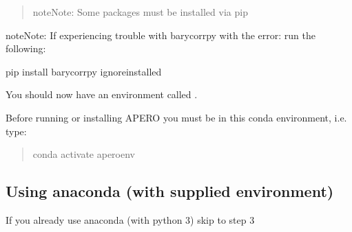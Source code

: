 \documentclass[a4paper,10pt,english]{report}
\begin{document}
\begin{enumerate}
\begin{quote}
\begin{sphinxadmonition}{note}{Note:}
Some packages must be installed via pip
\end{sphinxadmonition}

\begin{sphinxVerbatim}[commandchars=\\\{\}]
  
  
\end{sphinxVerbatim}
\end{quote}

\end{enumerate}

\begin{sphinxadmonition}{note}{Note:}
If experiencing trouble with barycorrpy with the error:
 run the following:

\begin{sphinxVerbatim}[commandchars=\\\{\}]
pip install barycorrpy \PYGZhy{}\PYGZhy{}ignore\PYGZhy{}installed
\end{sphinxVerbatim}
\end{sphinxadmonition}

You should now have an environment called .

Before running or installing APERO you must be in this conda environment, i.e. type:
\begin{quote}

\begin{sphinxVerbatim}[commandchars=\\\{\}]
conda activate apero\PYGZhy{}env
\end{sphinxVerbatim}
\end{quote}


\subsection{Using anaconda (with supplied environment)}
\label{\detokenize{misc/pythoninstallation:using-anaconda-with-supplied-environment}}\label{\detokenize{misc/pythoninstallation:python-install-anaconda-env}}
If you already use anaconda (with python 3) skip to step 3
\end{document}
